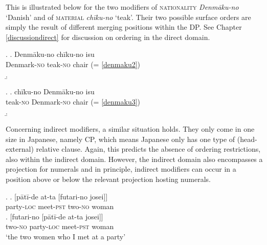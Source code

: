 \documentclass [output=book,colorlinks,citecolor=brown]{langscibook}
\begin{document}
This is illustrated below for the two modifiers of \textsc{nationality} \textit{Denmāku-no} `Danish’ and of \textsc{material} \textit{chīku-no} `teak’. Their two possible surface orders are simply the result of different merging positions within the DP. See Chapter \ref{discussiondirect} for discussion on ordering in the direct domain.

\newpage

\ex. \ag. Denmāku-no chīku-no isu\\
Denmark-\textsc{no} teak-\textsc{no} chair (= \ref{denmaku2})\\
\b. 

\ex. \ag. chīku-no Denmāku-no isu\\
teak-\textsc{no} Denmark-\textsc{no} chair (= \ref{denmaku3})\\
\b. 

Concerning indirect modifiers, a similar situation holds. They only come in one size in Japanese, namely CP, which means Japanese only has one type of (head-external) relative clause. Again, this predicts the absence of ordering restrictions, also within the indirect domain. However, the indirect domain also encompasses a projection for numerals and in principle, indirect modifiers can occur in a position above or below the relevant projection hosting numerals. %

\ex. \ag. [pātī-de at-ta [futari-no josei]]\\
party-\textsc{loc} meet-\textsc{pst} two-\textsc{no} woman\\
\bg. [futari-no [pātī-de at-ta josei]]\\
two-\textsc{no} party-\textsc{loc} meet-\textsc{pst} woman\\
`the two women who I met at a party'
\end{document}
